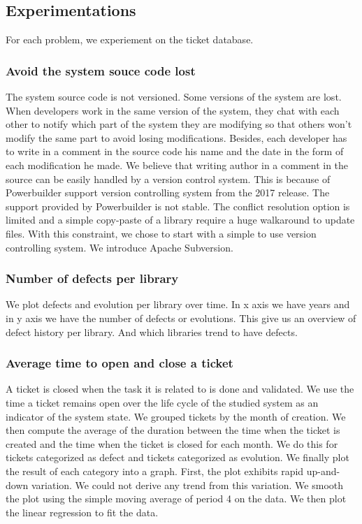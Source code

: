 \documentclass[10pt,conference]{IEEEtran}
\begin{document}
	 \subsection{Experimentations}
	For each problem, we experiement on the ticket database. 
	\subsubsection{Avoid the system souce code lost}
	The system source code is not versioned.  Some versions of the system are lost. 
	When developers work in the same version of the system, they chat with each other to notify which part of the system they are modifying so that others won't modify the same part to avoid losing modifications. Besides, each developer has to write in a comment in the source code his name and the date in the form of each modification he made.  We believe that writing author in a comment in the source can be easily handled by a version control system.
	This is because of Powerbuilder support version controlling system from the 2017 release. 
	The support provided by Powerbuilder is not stable.
	The conflict resolution option is limited and a simple copy-paste of a library require a huge walkaround to update files. 
	With this constraint, we chose to start with a simple to use version controlling system. We introduce Apache Subversion. 
	 \subsubsection{Number of defects per library}
	We plot  defects and evolution per library over time.  In x axis we have years and in y axis  we have the number of defects  or evolutions.
	This give us an overview of defect  history per library. And  which libraries   trend to have defects.
	\subsubsection{ Average time to open and close a ticket}
	A ticket is closed when the task it is related to is done and validated. 
	We use the time a ticket remains open over the life cycle of the studied system as an indicator of the system state. 
	We grouped tickets by the month of creation.
	We then compute the average of  the duration between the time when the ticket is created and the time when the ticket is closed for each month.  
	We do this for tickets categorized as defect and tickets categorized as evolution. 
	We finally plot the result of each category into a graph.  First, the plot exhibits rapid up-and-down variation.
	We could not derive any trend from this variation. 
	We smooth the plot using the simple moving average of period 4 on the data.  
	We then plot the linear regression to fit the data. 
	
\end{document}
